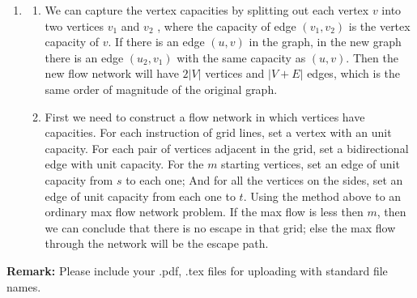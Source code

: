 \documentclass[12pt,a4paper]{article}
\makeatletter
\newtheorem*{solution}{Solution}
\theoremstyle{definition}
\renewenvironment{solution}[1][Solution] {\par\pushQED{\qed}\normalfont\topsep6\p@\@plus6\p@\relax\trivlist\item[\hskip\labelsep\bfseries#1\@addpunct{.}]\ignorespaces}{\popQED\endtrivlist\@endpefalse} \makeatother
\makeatother
\begin{document}
\begin{enumerate}
	\begin{solution}
		\begin{enumerate}
			\item We can capture the vertex capacities by splitting out each vertex $ v $ into two vertices $ v_{1} $ and $ v_{2} $ ,
			where the capacity of edge $ (v_{1},v_{2}) $ is the vertex capacity of $ v $. If there is an edge $ (u,v) $ in the graph, in the new graph there is an edge $ (u_2, v_1) $ with the same capacity as $ (u,v) $. Then the new flow network will have $ 2|V| $ vertices and $ |V+E| $ edges, which is the same order of magnitude of the original graph.
			
			\item First we need to construct a flow network in which vertices have capacities. For each instruction of grid lines, set a vertex with an unit capacity. For each pair of vertices adjacent in the grid, set a bidirectional  edge with unit capacity. For the $ m $ starting vertices, set an edge of unit capacity from $ s $ to each one; And for all the vertices on the sides, set an edge of unit capacity from each one to $ t $. Using the method above to an ordinary max flow network problem. If the max flow is less then $ m $, then we can conclude that there is no escape in that grid; else the max flow through the network will be the escape path. 
		\end{enumerate}
	\end{solution}
    
\end{enumerate}

\textbf{Remark:} Please include your .pdf, .tex files for uploading with standard file names.
\newpage


\end{document}
